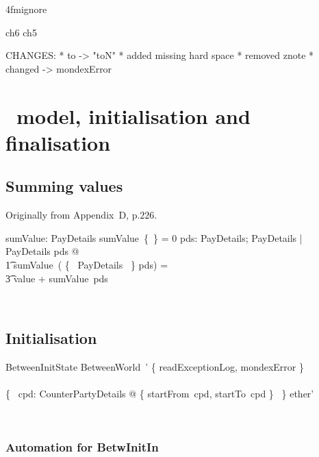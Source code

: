 \ai4fmignore{
\begin{zsection}
  \SECTION ch6 \parents ch5
\end{zsection}
CHANGES:
* to -> "toN"
* added missing hard space
* removed znote
* changed \bot -> mondexError
}

\chapter{\Betw\ model, initialisation and finalisation}\label{ch6}

\section{Summing values}\label{ch6.sumValue}

Originally from Appendix~D, p.$226$.
\begin{LADef}
\begin{axdef}
   sumValue: \finset PayDetails \fun \nat
\where
      sumValue~\{~\} = 0
   \also
      \forall pds: \finset PayDetails; PayDetails | \theta PayDetails \notin pds @ \\
          \t1 sumValue~( \{~ \theta PayDetails ~\} \cup pds) = \\
                \t3 value + sumValue~pds
\end{axdef}~\end{LADef}

\section{Initialisation}\label{ch6.init}

\begin{LSDef}
\begin{schema}{BetweenInitState}
  BetweenWorld~' 
\where 
  \{ readExceptionLog, mondexError \}
  \\ %
  \cup
  \\ %
  \bigcup \{~ cpd: CounterPartyDetails @ \{ startFrom~cpd, startTo~cpd \} ~\}
  \also %
  \subseteq ether'
\end{schema}~\end{LSDef}

\subsection*{Automation for BetwInitIn}

